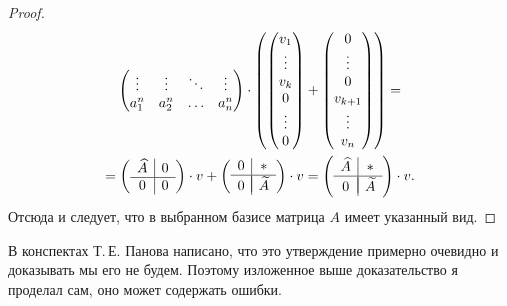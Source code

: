 \begin{proof}
\begin{multline*}
\begin{pmatrix}
            \vdots & \vdots & \ddots & \vdots\\
            a^n_1 & a^n_2 & \ldots & a^n_n
        \end{pmatrix} \cdot \left(
        \begin{pmatrix}
            v_1\\
            \vdots\\
            v_k\\
            0\\
            \vdots\\
            0
        \end{pmatrix}
        +
        \begin{pmatrix}
            0\\
            \vdots\\
            0\\
            v_{k + 1}\\
            \vdots\\
            v_n
        \end{pmatrix}
        \right) =\\
        =
        \left(
        \begin{array}{c | c}
            \widehat{A} & 0\\
            \hline
            0 & 0
        \end{array}
        \right) \cdot v + 
        \left(
        \begin{array}{c | c}
            0 & \ast\\
            \hline\vspace{-4mm}\\
            0 & \widetilde{A}
        \end{array}
        \right) \cdot v =
        \left(
        \begin{array}{c | c}
            \widehat{A} & \ast\\
            \hline\vspace{-4mm}\\
            0 & \widetilde{A}
        \end{array}
        \right) \cdot v.
    \end{multline*}
    Отсюда и следует, что в выбранном базисе матрица $A$ имеет указанный вид.
\end{proof}

\begin{remark}
    В конспектах Т.\,Е. Панова написано, что это утверждение примерно очевидно и доказывать мы его не будем. Поэтому изложенное выше доказательство я проделал сам, оно может содержать ошибки.
\end{remark}

